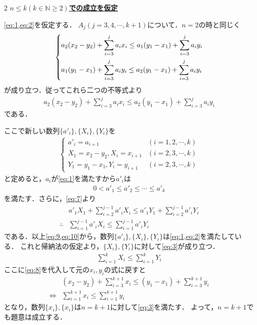\documentclass[../../main.tex]{subfiles}
\begin{document}
\begin{multicols}{2}
  \underline{\textbf{$n\le k (k \in \mathbb{N} \ge 2)$での成立を仮定}}

  \cref{eq:1,eq:2}を仮定する．
  $A_j (j=3,4,\cdots,k+1)$について．$n=2$の時と同じく
  \begin{align}
    \begin{dcases}
      a_2 (x_2 - y_2) + \sum_{i=3}^{j} a_i x_i \le a_1 (y_1 - x_1) + \sum_{i=3}^{j} a_i y_i \\
      a_1 (y_1 - x_1) + \sum_{i=3}^{j} a_i y_i \le a_2 (y_1 - x_1) + \sum_{i=3}^{j} a_i y_i
    \end{dcases}
  \end{align}
  が成り立つ．従ってこれら二つの不等式より
  \begin{align}
    a_2 (x_2 - y_2) + \sum_{i=3}^{j} a_i x_i \le a_2 (y_1 - x_1) + \sum_{i=3}^{j} a_i y_i \label{eq:7}
  \end{align}
  である．

  ここで新しい数列$\{a'_i\}, \{X_i\}, \{Y_i\}$を
  \begin{align}
    \begin{cases}
      a'_i = a_{i+1}                 & (i=1,2,\cdots,k) \\
      X_1 = x_2 - y_2, X_i = x_{i+1} & (i=2,3,\cdots,k) \\
      Y_1 = y_1 - x_1, Y_i = y_{i+1} & (i=2,3,\cdots,k)
    \end{cases} \label{eq:8}
  \end{align}
  と定めると，$a_i$が\cref{eq:1}を満たすから$a'_{i}$は
  \begin{align}
    0 < a'_1 \le a'_2 \le \cdots \le a'_{k} \label{eq:9}
  \end{align}
  を満たす．さらに，\cref{eq:7}より
  \begin{align}
    & a'_1 X_1 + \sum_{i=2}^{j-1} a'_i X_i \le  a'_1 Y_1 + \sum_{i=2}^{j-1} a'_i Y_i \nonumber \\
    \therefore
    & \sum_{i=1}^{j-1} a'_{i}X_{i} \le \sum_{i=1}^{j-1} a'_{i}Y_{i} \label{eq:10}
  \end{align}
  である．以上\cref{eq:9,eq:10}から，数列$\{a'_i\}, \{X_i\}, \{Y_i\}$は\cref{eq:1,eq:2}を満たしている．
  これと帰納法の仮定より，$\{X_i\}, \{Y_i\}$に対して\cref{eq:3}が成り立つ．
  \begin{align}
    \sum_{i=1}^{k} X_i \le \sum_{i=1}^{k} Y_i
  \end{align}
  ここに\cref{eq:8}を代入して元の$x_i,y_i$の式に戻すと
  \begin{align}
    & \left(x_2 - y_2\right) + \sum_{i=3}^{k+1} x_i
    \le \left(y_1 - x_1\right) + \sum_{i=3}^{k+1} y_i    \\
    \iff &
    \sum_{i=1}^{k+1} x_i \le \sum_{i=1}^{k+1} y_i
  \end{align}
  となり，数列$\{x_i\}, \{x_i\}$は$n=k+1$に対して\cref{eq:3}を満たす．
  よって，$n=k+1$でも題意は成立する．


\end{multicols}
\end{document}

